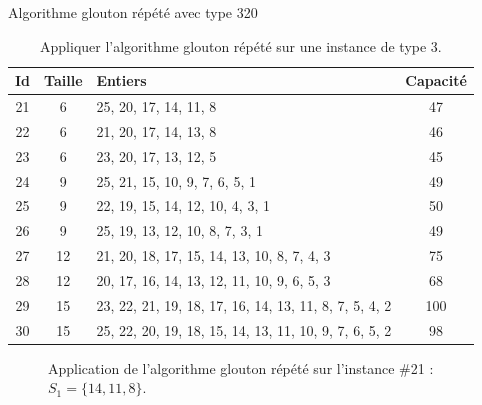 \begin{exercice}[label=ex:MTGS3]{Algorithme glouton répété avec type 3}{20}

\begin{table}[H]
\centering
\begin{tabular}{cclc}
  \toprule
Id & Taille & Entiers & Capacité \\
  \midrule
 21 &   6 & 25, 20, 17, 14, 11, 8 &  47 \\
   22 &   6 & 21, 20, 17, 14, 13, 8 &  46 \\
   23 &   6 & 23, 20, 17, 13, 12, 5 &  45 \\
   24 &   9 & 25, 21, 15, 10, 9, 7, 6, 5, 1 &  49 \\
   25 &   9 & 22, 19, 15, 14, 12, 10, 4, 3, 1 &  50 \\
   26 &   9 & 25, 19, 13, 12, 10, 8, 7, 3, 1 &  49 \\
   27 &  12 & 21, 20, 18, 17, 15, 14, 13, 10, 8, 7, 4, 3 &  75 \\
   28 &  12 & 20, 17, 16, 14, 13, 12, 11, 10, 9, 6, 5, 3 &  68 \\
   29 &  15 & 23, 22, 21, 19, 18, 17, 16, 14, 13, 11, 8, 7, 5, 4, 2 & 100 \\
   30 &  15 & 25, 22, 20, 19, 18, 15, 14, 13, 11, 10, 9, 7, 6, 5, 2 &  98 \\
   \bottomrule
\end{tabular}
\caption{Appliquer l'algorithme glouton répété sur une instance de type 3.}
\label{tab:MTGS3}
\end{table}

\end{exercice}

\begin{figure}[htbp]
\centering
{}
\caption{Application de l'algorithme glouton répété sur l'instance \#21 : $S_1 = \{14,11,8\}$.}
\label{fig:MTGS3-21}
\end{figure}

\ifshowsols

